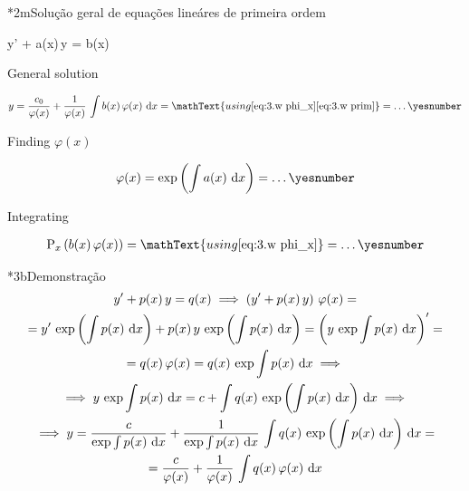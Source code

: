 \documentclass["AM3C-Slides_annotations.tex"]{subfiles}
\begin{document}
\begin{sectionBox}*2m{Solução geral de equações lineáres de primeira ordem} %
  \begin{BM}
    y' + a(x)\,y = b(x)
  \end{BM}


  General solution
  \begin{tcolorbox}
    \begin{gather*}
      y
      = \frac{c_0}{\varphi(x)}
      + \frac{1  }{\varphi(x)}
      \,\int{b(x)\,\varphi(x)\,\odif{x}}
      = \mathText{using 
        \eqref{eq:3.w phi_x}
        \eqref{eq:3.w prim}
      }
      = \dots
      \yesnumber\label{eq:3.w answer}
    \end{gather*}
  \end{tcolorbox}

  Finding \(\varphi(x)\)
  \begin{tcolorbox}
    \begin{gather*}
      \varphi(x) 
      = \exp{\left(
          \int{a(x)\,\odif{x}}
      \right)}
      = \dots
      \yesnumber\label{eq:3.w phi_x}
    \end{gather*}
  \end{tcolorbox}

  Integrating
  \begin{tcolorbox}
    \begin{gather*}
      \prim_x{\left(
          b(x)\,\varphi(x)
      \right)}
      = \mathText{using \eqref{eq:3.w phi_x}}
      = \dots
      \yesnumber\label{eq:3.w prim}
    \end{gather*}
  \end{tcolorbox}

  \begin{sectionBox}*3b{Demonstração} %
    \begin{gather*}
      y' + p(x)\,y = q(x)
      \implies
      \left(
        y' + p(x)\,y 
      \right)\,\varphi(x)
      = \\
      = y'\,\exp{\left(\int{p(x)\,\odif{x}}\right)}
      + p(x)\,y\,\exp{\left( \int{p(x)\,\odif{x}} \right)}
      = \left(
        y\,\exp{\int{p(x)\,\odif{x}}}
      \right)'
      = \\
      = q(x)\,\varphi(x)
      = q(x)\,\exp{\int{p(x)\,\odif{x}}}
      \implies \\
      \implies y\,\exp{\int{p(x)\,\odif{x}}}
      = c+\int{
        q(x)\,\exp{\left(\int{p(x)\,\odif{x}}\right)}
        \,\odif{x}
      }
      \implies \\
      \implies y
      = \frac{c}{\exp{\int{p(x)\,\odif{x}}}}
      + \frac{1}{\exp{\int{p(x)\,\odif{x}}}}
      \,\int{
        q(x)\,\exp{\left(\int{p(x)\,\odif{x}}\right)}
        \,\odif{x}
      }
      = \\
      = \frac{c}{\varphi(x)}
      + \frac{1}{\varphi(x)}
      \,\int{q(x)\,\varphi(x)\,\odif{x}}
    \end{gather*}
  \end{sectionBox}

\end{sectionBox}
\end{document}
